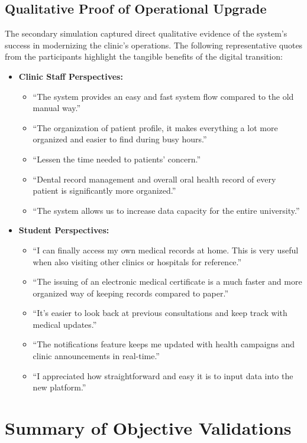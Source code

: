 \subsection{Qualitative Proof of Operational Upgrade}
The secondary simulation captured direct qualitative evidence of the system's success in modernizing the clinic's operations. The following representative quotes from the participants highlight the tangible benefits of the digital transition:

\begin{itemize}
    \item \textbf{Clinic Staff Perspectives:}
    \begin{itemize}
        \item ``The system provides an easy and fast system flow compared to the old manual way.''
        \item ``The organization of patient profile, it makes everything a lot more organized and easier to find during busy hours.''
        \item ``Lessen the time needed to patients’ concern.''
        \item ``Dental record management and overall oral health record of every patient is significantly more organized.''
        \item ``The system allows us to increase data capacity for the entire university.''
    \end{itemize}
    \item \textbf{Student Perspectives:}
    \begin{itemize}
        \item ``I can finally access my own medical records at home. This is very useful when also visiting other clinics or hospitals for reference.''
        \item ``The issuing of an electronic medical certificate is a much faster and more organized way of keeping records compared to paper.''
        \item ``It’s easier to look back at previous consultations and keep track with medical updates.''
        \item ``The notifications feature keeps me updated with health campaigns and clinic announcements in real-time.''
        \item ``I appreciated how straightforward and easy it is to input data into the new platform.''
    \end{itemize}
\end{itemize}

\section{Summary of Objective Validations}

